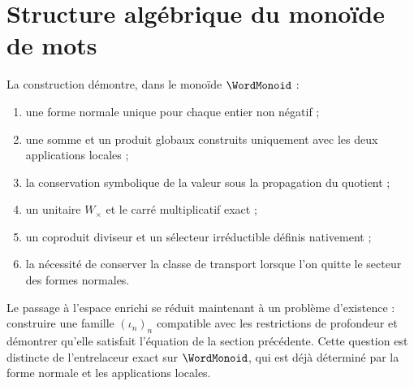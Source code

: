 \section{Structure algébrique du monoïde de mots}

La construction démontre, dans le monoïde \(\WordMonoid\) :
\begin{enumerate}
 \item une forme normale unique pour chaque entier non négatif ;
 \item une somme et un produit globaux construits uniquement avec les deux applications locales ;
 \item la conservation symbolique de la valeur sous la propagation du quotient ;
 \item un unitaire $W_\times$ et le carré multiplicatif exact ;
 \item un coproduit diviseur et un sélecteur irréductible définis nativement ;
 \item la nécessité de conserver la classe de transport lorsque l'on quitte le
 secteur des formes normales.
\end{enumerate}

Le passage à l'espace enrichi se réduit maintenant à un problème d'existence :
construire une famille \((\iota_n)_n\) compatible avec les restrictions de
profondeur et démontrer qu'elle satisfait l'équation de la section précédente.
Cette question est distincte de l'entrelaceur exact sur
\(\WordMonoid\), qui est déjà déterminé par la forme normale et les
applications locales.
